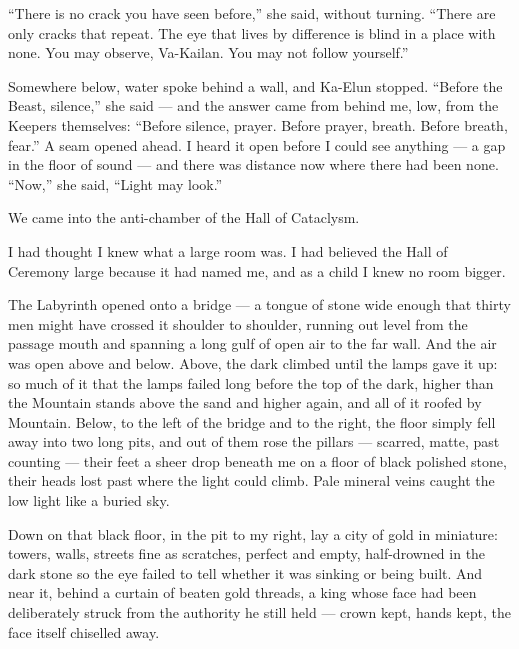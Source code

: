 ``There is no crack you have seen before,'' she said, without turning. ``There are only cracks that repeat. The eye that lives by difference is blind in a place with none. You may observe, Va-Kailan. You may not follow yourself.''\par
 
Somewhere below, water spoke behind a wall, and Ka-Elun stopped. ``Before the Beast, silence,'' she said --- and the answer came from behind me, low, from the Keepers themselves: ``Before silence, prayer. Before prayer, breath. Before breath, fear.'' A seam opened ahead. I heard it open before I could see anything --- a gap in the floor of sound --- and there was distance now where there had been none. ``Now,'' she said, ``Light may look.''\par
 
We came into the anti-chamber of the Hall of Cataclysm.\par
 
I had thought I knew what a large room was. I had believed the Hall of Ceremony large because it had named me, and as a child I knew no room bigger.\par

The Labyrinth opened onto a bridge --- a tongue of stone wide enough that thirty men might have crossed it shoulder to shoulder, running out level from the passage mouth and spanning a long gulf of open air to the far wall. And the air was open above and below. Above, the dark climbed until the lamps gave it up: so much of it that the lamps failed long before the top of the dark, higher than the Mountain stands above the sand and higher again, and all of it roofed by Mountain. Below, to the left of the bridge and to the right, the floor simply fell away into two long pits, and out of them rose the pillars --- scarred, matte, past counting --- their feet a sheer drop beneath me on a floor of black polished stone, their heads lost past where the light could climb. Pale mineral veins caught the low light like a buried sky.\par

Down on that black floor, in the pit to my right, lay a city of gold in miniature: towers, walls, streets fine as scratches, perfect and empty, half-drowned in the dark stone so the eye failed to tell whether it was sinking or being built. And near it, behind a curtain of beaten gold threads, a king whose face had been deliberately struck from the authority he still held --- crown kept, hands kept, the face itself chiselled away.\par

